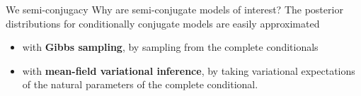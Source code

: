 \documentclass[10pt]{beamer}
\begin{document}
{
	\begin{frame}{We {\red \heart} semi-conjugacy}	 
	 Why are semi-conjugate models of interest?  
	 \vfill 
	 The posterior distributions for conditionally conjugate models are easily approximated 
	 \begin{itemize}
	 \item with \textbf{Gibbs sampling}, by sampling from the complete conditionals
	 \item with \textbf{mean-field variational inference}, by taking variational expectations of the natural parameters of the complete conditional.	
	 \end{itemize}  
	 
	\end{frame}
}
\end{document}
